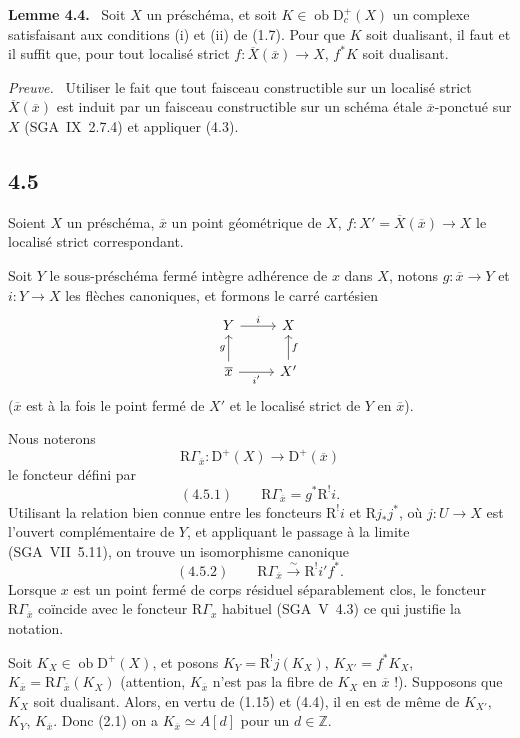 \documentclass[11pt]{article}
\newenvironment{statement}[1]{\par\medskip\noindent\textbf{#1.}\ }{\par\medskip}
\newenvironment{prooftext}[1][Proof]{\par\noindent\emph{#1.}\ }{\par\medskip}
\newcommand{\R}{\mathrm{R}}
\newcommand{\D}{\mathrm{D}}
\newcommand{\Z}{\mathbb{Z}}
\newcommand{\ob}{\operatorname{ob}}
\newcommand{\ol}[1]{\overline{#1}}
\providecommand{\ob}{\operatorname{ob}}
\providecommand{\R}{\mathrm R}
\providecommand{\Z}{\mathbb Z}
\begin{document}
\begin{statement}{Lemme 4.4}
Soit $X$ un préschéma, et soit $K\in\ob\D_c^+(X)$ un complexe satisfaisant aux conditions (i) et (ii) de (1.7). Pour que $K$ soit dualisant, il faut et il suffit que, pour tout localisé strict $f:\ol{X}(\ol{x})\to X$, $f^*K$ soit dualisant.
\end{statement}

\begin{prooftext}[Preuve]
Utiliser le fait que tout faisceau constructible sur un localisé strict $\ol{X}(\ol{x})$ est induit par un faisceau constructible sur un schéma étale $\ol{x}$-ponctué sur $X$ (SGA~IX~2.7.4) et appliquer (4.3).
\end{prooftext}

\subsection*{4.5}
Soient $X$ un préschéma, $\ol{x}$ un point géométrique de $X$, $f:X'=\ol{X}(\ol{x})\to X$ le localisé strict correspondant.

Soit $Y$ le sous-préschéma fermé intègre adhérence de $x$ dans $X$, notons $g:\ol{x}\to Y$ et $i:Y\to X$ les flèches canoniques, et formons le carré cartésien
\[
\begin{tikzcd}
Y \arrow[r,"i"] & X \\
\ol{x} \arrow[u,"g"] \arrow[r,"i'"'] & X' \arrow[u,"f"']
\end{tikzcd}
\]
($\ol{x}$ est à la fois le point fermé de $X'$ et le localisé strict de $Y$ en $\ol{x}$).

Nous noterons
\[
\R\Gamma_{\ol{x}}:\D^+(X)\longrightarrow \D^+(\ol{x})
\]
le foncteur défini par
\[
(4.5.1)\qquad \R\Gamma_{\ol{x}}=g^*\R^{!}i.
\]
Utilisant la relation bien connue entre les foncteurs $\R^{!}i$ et $\R j_*j^*$, où $j:U\to X$ est l'ouvert complémentaire de $Y$, et appliquant le passage à la limite (SGA~VII~5.11), on trouve un isomorphisme canonique
\[
(4.5.2)\qquad \R\Gamma_{\ol{x}}\xrightarrow{\sim}\R^{!}i' f^*.
\]
Lorsque $x$ est un point fermé de corps résiduel séparablement clos, le foncteur $\R\Gamma_{\ol{x}}$ coïncide avec le foncteur $\R\Gamma_x$ habituel (SGA~V~4.3) ce qui justifie la notation.

Soit $K_X\in\ob\D^+(X)$, et posons $K_Y=\R^{!}j(K_X)$, $K_{X'}=f^*K_X$, $K_{\ol{x}}=\R\Gamma_{\ol{x}}(K_X)$ (attention, $K_{\ol{x}}$ n'est pas la fibre de $K_X$ en $\ol{x}$ !). Supposons que $K_X$ soit dualisant. Alors, en vertu de (1.15) et (4.4), il en est de même de $K_{X'}$, $K_Y$, $K_{\ol{x}}$. Donc (2.1) on a $K_{\ol{x}}\simeq A[d]$ pour un $d\in\Z$.
\end{document}
